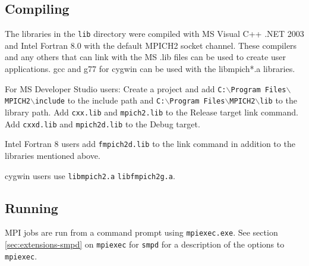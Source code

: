 \documentclass[dvipdfm,11pt]{article}
\begin{document}
\subsection{Compiling}
\label{sec:wincompile}

The libraries in the \texttt{lib} directory were compiled with MS Visual C++ .NET 2003
and Intel Fortran 8.0 with the default MPICH2 socket channel.  These 
compilers and any others that can link with the MS .lib files can be used to
create user applications.  gcc and g77 for cygwin can be used with the 
libmpich*.a libraries.

For MS Developer Studio users: Create a project and add
\texttt{C:$\backslash$Program
  Files$\backslash$MPICH2$\backslash$include} to the include path and
\texttt{C:$\backslash$Program Files$\backslash$MPICH2$\backslash$lib} to
the library path.  Add \texttt{cxx.lib} and \texttt{mpich2.lib} to the
Release target link command.  Add \texttt{cxxd.lib} and
\texttt{mpich2d.lib} to the Debug target.

Intel Fortran 8 users add \texttt{fmpich2d.lib} to the link command in
addition to the libraries mentioned above.

cygwin users use \texttt{libmpich2.a} \texttt{libfmpich2g.a}.

\subsection{Running}
\label{sec:winrun}

MPI jobs are run from a command prompt using \texttt{mpiexec.exe}.  See
section \ref{sec:extensions-smpd} on \texttt{mpiexec} for \texttt{smpd}
for a description of the options to \texttt{mpiexec}.




\end{document}
